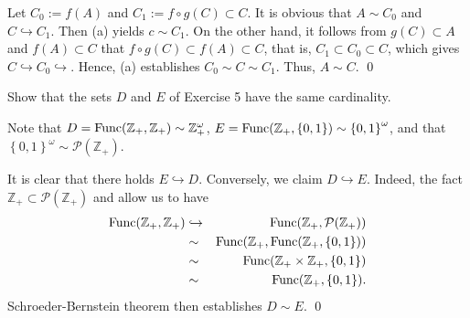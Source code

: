 \documentclass[a4paper,12pt]{article}
\begin{document}
\begin{sol}
	Let
	\( C_0:=f(A) \)
	and
	\( C_1:=f \circ g(C) \subset C \).
	It is obvious that
	\( A \sim C_0 \)
	and
	\( C \hookrightarrow C_1\).
	Then (a) yields \( c \sim C_1 \).
	On the other hand, it follows from
	\( g(C) \subset A \) and \( f(A) \subset C \)
	that
	\( f \circ g(C) \subset f(A) \subset C \),
	that is,
	\( C_1 \subset C_0 \subset C \),
	which gives \( C \hookrightarrow C_0 \hookrightarrow \).
	Hence, (a) establishes \( C_0 \sim C \sim C_1 \).
	Thus, \( A \sim C \).
	\qed\end{sol}

\begin{exe}
	Show that the sets \( D \) and \( E \) of Exercise 5
	have the same cardinality.
\end{exe}\begin{sol}
	Note that
	\( D=\mathrm{Func}(\mathbb{Z}_{+},\mathbb{Z}_{+})
	\sim \mathbb{Z}_{+}^{\omega} \),
	\( E=\mathrm{Func}(\mathbb{Z}_{+},\left\{ 0,1 \right\})
	\sim \left\{ 0,1 \right\}^{\omega} \),
	and that 
	\( \left\{ 0,1 \right\}^{\omega} \sim \mathcal{P}(\mathbb{Z}_{+})\).
	
	It is clear that there holds \( E \hookrightarrow D \).
	Conversely, we claim \( D \hookrightarrow E \).
	Indeed, the fact
	\( \mathbb{Z}_{+} \subset \mathcal{P}(\mathbb{Z}_{+}) \)
	and 
	allow us to have
	\begin{eqnarray*}
		\mathrm{Func}(\mathbb{Z}_{+},\mathbb{Z}_{+})
		&\hookrightarrow &
		\mathrm{Func}(\mathbb{Z}_{+},\mathcal{P}(\mathbb{Z}_{+}))\\
		&\sim&
		\mathrm{Func}(\mathbb{Z}_{+},\mathrm{Func}(\mathbb{Z}_{+},\left\{ 0,1 \right\}))\\
		&\sim&
		\mathrm{Func}(\mathbb{Z}_{+}\times \mathbb{Z}_{+},\left\{ 0,1 \right\})\\
		&\sim&
		\mathrm{Func}(\mathbb{Z}_{+},\left\{ 0,1 \right\}).
	\end{eqnarray*}
	Schroeder-Bernstein theorem then establishes \( D \sim E \).
	\qed\end{sol}
\end{document}
